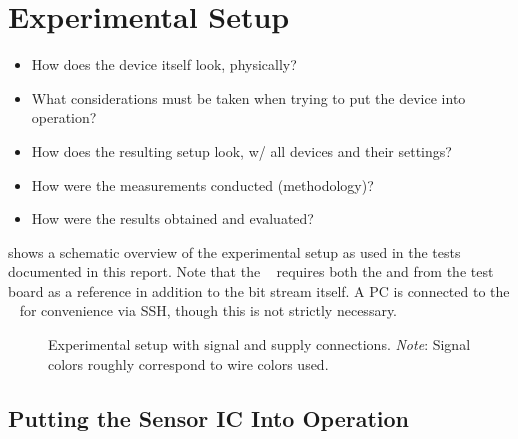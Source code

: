 \chapter{Experimental Setup}
\label{ch:experimentalSetup}

\begin{itemize}\tightlist
    \item
        How does the device itself look, physically?
    \item
        What considerations must  be taken when trying to put  the device into
        operation?
    \item
        How does the resulting setup look, w/ all devices and their settings?
    \item
        How were the measurements conducted (methodology)?
    \item
        How were the results obtained and evaluated?
\end{itemize}


 shows  a schematic  overview of  the experimental
setup as  used in the tests  documented in this report. Note  that the \raspi~
requires  both the   and   from  the test  board as  a
reference  in addition  to the  bit stream  itself. A PC  is connected  to the
\raspi~ for convenience via SSH, though this is not strictly necessary.

\begin{figure}
    
    \caption{%
        Experimental    setup   with    signal    and   supply    connections.
        \emph{Note}: Signal colors roughly correspond to wire colors used.%
    }
    \label{fig:experimentDiagram}
\end{figure}


\section{Putting the Sensor IC Into Operation}
\label{sec:ICintoOperation}

